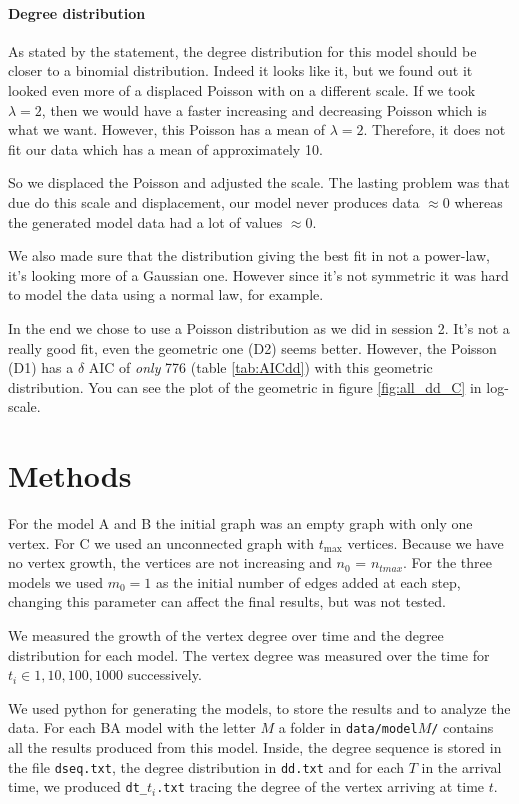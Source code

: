 \documentclass[a4paper]{article}
\begin{document}
\paragraph{Degree distribution}

As stated by the statement, the degree distribution for this model should be
closer to a binomial distribution. Indeed it looks like it, but we found out it
looked even more of a displaced Poisson with on a different scale. If we took
$\lambda = 2$, then we would have a faster increasing and decreasing Poisson
which is what we want. However, this Poisson has a mean of $\lambda = 2$.
Therefore, it does not fit our data which has a mean of approximately 10.

So we displaced the Poisson and adjusted the scale. The lasting problem was that
due do this scale and displacement, our model never produces data $\approx 0$
whereas the generated model data had a lot of values $\approx 0$.

We also made sure that the distribution giving the best fit in not a power-law,
it's looking more of a Gaussian one. However since it's not symmetric it was
hard to model the data using a normal law, for example.

In the end we chose to use a Poisson distribution as we did in session 2. It's
not a really good fit, even the geometric one (D2) seems better.
However, the Poisson (D1) has a $\delta$ AIC of \textit{only} 776 (table
\ref{tab:AICdd}) with this geometric distribution. You can see the plot of the
geometric in figure \ref{fig:all_dd_C} in log-scale.


\section{Methods} \label{methods}

For the model A and B the initial graph was an empty graph with only one vertex.
For C we used an unconnected graph with $t_{\max}$ vertices.  Because we have no
vertex growth, the vertices are not increasing and $n_0$ = $n_{tmax}$.  For the
three models we used $m_0 = 1$ as the initial number of edges added at each
step, changing this parameter can affect the final results, but was not tested.

We measured the growth of the vertex degree over time and the degree
distribution for each model. The vertex degree was measured over the time for
$t_i \in {1, 10, 100, 1000}$ successively.

We used python for generating the models, to store the results and to analyze
the data. For each BA model with the letter $M$ a folder in
\texttt{data/model$M$/} contains all the results produced from this model.
Inside, the degree sequence is stored in the file \texttt{dseq.txt}, the degree
distribution in \texttt{dd.txt} and for each $T$ in the arrival time, we
produced \texttt{dt\_$t_i$.txt} tracing the degree of the vertex arriving at
time $t$.
\end{document}
